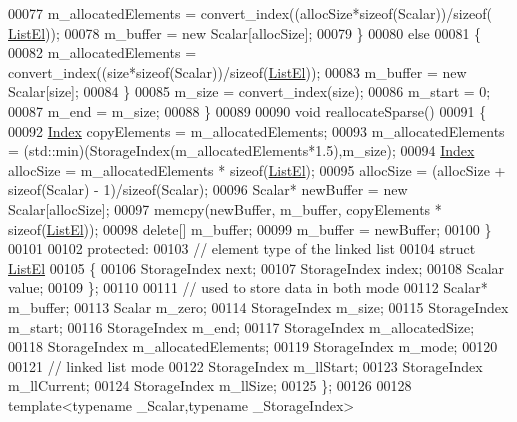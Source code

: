 \begin{DoxyCode}
00077         m\_allocatedElements = convert\_index((allocSize*\textcolor{keyword}{sizeof}(Scalar))/\textcolor{keyword}{sizeof}(
      \hyperlink{struct_eigen_1_1internal_1_1_ambi_vector_1_1_list_el}{ListEl}));
00078         m\_buffer = \textcolor{keyword}{new} Scalar[allocSize];
00079       \}
00080       \textcolor{keywordflow}{else}
00081       \{
00082         m\_allocatedElements = convert\_index((size*\textcolor{keyword}{sizeof}(Scalar))/\textcolor{keyword}{sizeof}(\hyperlink{struct_eigen_1_1internal_1_1_ambi_vector_1_1_list_el}{ListEl}));
00083         m\_buffer = \textcolor{keyword}{new} Scalar[size];
00084       \}
00085       m\_size = convert\_index(size);
00086       m\_start = 0;
00087       m\_end = m\_size;
00088     \}
00089 
00090     \textcolor{keywordtype}{void} reallocateSparse()
00091     \{
00092       \hyperlink{namespace_eigen_a62e77e0933482dafde8fe197d9a2cfde}{Index} copyElements = m\_allocatedElements;
00093       m\_allocatedElements = (std::min)(StorageIndex(m\_allocatedElements*1.5),m\_size);
00094       \hyperlink{namespace_eigen_a62e77e0933482dafde8fe197d9a2cfde}{Index} allocSize = m\_allocatedElements * \textcolor{keyword}{sizeof}(\hyperlink{struct_eigen_1_1internal_1_1_ambi_vector_1_1_list_el}{ListEl});
00095       allocSize = (allocSize + \textcolor{keyword}{sizeof}(Scalar) - 1)/\textcolor{keyword}{sizeof}(Scalar);
00096       Scalar* newBuffer = \textcolor{keyword}{new} Scalar[allocSize];
00097       memcpy(newBuffer,  m\_buffer,  copyElements * \textcolor{keyword}{sizeof}(\hyperlink{struct_eigen_1_1internal_1_1_ambi_vector_1_1_list_el}{ListEl}));
00098       \textcolor{keyword}{delete}[] m\_buffer;
00099       m\_buffer = newBuffer;
00100     \}
00101 
00102   \textcolor{keyword}{protected}:
00103     \textcolor{comment}{// element type of the linked list}
00104     \textcolor{keyword}{struct }\hyperlink{struct_eigen_1_1internal_1_1_ambi_vector_1_1_list_el}{ListEl}
00105     \{
00106       StorageIndex next;
00107       StorageIndex index;
00108       Scalar value;
00109     \};
00110 
00111     \textcolor{comment}{// used to store data in both mode}
00112     Scalar* m\_buffer;
00113     Scalar m\_zero;
00114     StorageIndex m\_size;
00115     StorageIndex m\_start;
00116     StorageIndex m\_end;
00117     StorageIndex m\_allocatedSize;
00118     StorageIndex m\_allocatedElements;
00119     StorageIndex m\_mode;
00120 
00121     \textcolor{comment}{// linked list mode}
00122     StorageIndex m\_llStart;
00123     StorageIndex m\_llCurrent;
00124     StorageIndex m\_llSize;
00125 \};
00126 
00128 \textcolor{keyword}{template}<\textcolor{keyword}{typename} \_Scalar,\textcolor{keyword}{typename} \_StorageIndex>

\end{DoxyCode}
